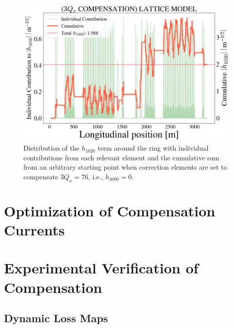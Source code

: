 \begin{figure}[H]
    \centering
    \includegraphics[width=\columnwidth]{chapter4/h1020_3qxcomp.png}
    \caption{Distribution of the $h_{1020}$ term around the ring with individual contributions from each relevant element and the cumulative sum from an arbitrary starting point when correction elements are set to compensate $3Q_x=76$, i.e., $h_{3000}=0$.}
    \label{fig:h1020_3qxcomp}
\end{figure}

\section{Optimization of Compensation Currents}

\section{Experimental Verification of Compensation}

\subsection{\label{sec:lossmaps}Dynamic Loss Maps}

